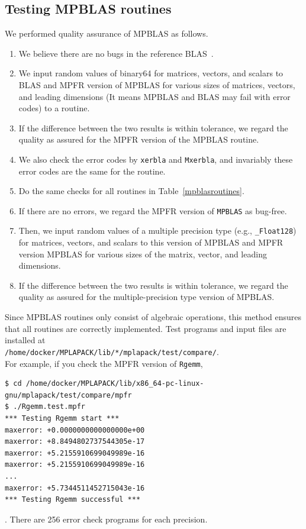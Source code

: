 \documentclass[12pt]{article}
\begin{document}
\subsection{Testing MPBLAS routines}
We performed quality assurance of MPBLAS as follows.
\begin{enumerate}
    \item We believe there are no bugs in the reference BLAS~\cite{10.1145/567806.567807}.
    \item We input random values of binary64 for matrices, vectors, and scalars to BLAS and MPFR version of MPBLAS for various sizes of matrices, vectors, and leading dimensions (It means MPBLAS and BLAS may fail with error codes) to a routine.
    \item If the difference between the two results is within tolerance, we regard the quality as assured for the MPFR version of the MPBLAS routine.
    \item We also check the error codes by {\tt xerbla} and {\tt Mxerbla}, and invariably these error codes are the same for the routine.
    \item Do the same checks for all routines in Table~\ref{mpblasroutines}.
    \item If there are no errors, we regard the MPFR version of {\tt MPBLAS} as bug-free.
    \item Then, we input random values of a multiple precision type (e.g., {\tt \_Float128}) for matrices, vectors, and scalars to this version of MPBLAS and MPFR version MPBLAS for various sizes of the matrix, vector, and leading dimensions.
    \item If the difference between the two results is within tolerance, we regard the quality as assured for the multiple-precision type version of MPBLAS.
\end{enumerate}
Since MPBLAS routines only consist of algebraic operations, this method ensures that all routines are correctly implemented.
Test programs and input files are installed at \\
{\tt /home/docker/MPLAPACK/lib/*/mplapack/test/compare/}.\\
For example, if you check the MPFR version of {\tt Rgemm},
\begin{verbatim}
$ cd /home/docker/MPLAPACK/lib/x86_64-pc-linux-gnu/mplapack/test/compare/mpfr
$ ./Rgemm.test.mpfr
*** Testing Rgemm start ***
maxerror: +0.0000000000000000e+00
maxerror: +8.8494802737544305e-17
maxerror: +5.2155910699049989e-16
maxerror: +5.2155910699049989e-16
...
maxerror: +5.7344511452715043e-16
*** Testing Rgemm successful ***
\end{verbatim}
. There are 256 error check programs for each precision.
\end{document}
